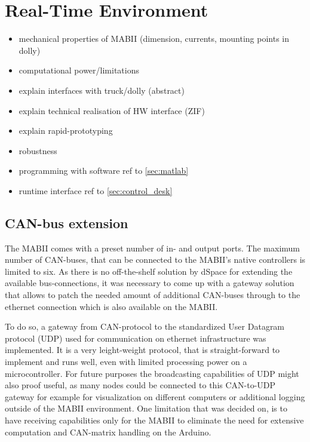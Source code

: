 \documentclass[ExampleMasters.tex]{subfiles}
\begin{document}
\section{Real-Time Environment}
\label{sec:realtime_environment}



\begin{itemize}
	\item mechanical properties of MABII (dimension, currents, mounting points in dolly)
	\item computational power/limitations
	\item explain interfaces with truck/dolly (abstract)
	\item explain technical realisation of HW interface (ZIF)
	\item explain rapid-prototyping
	\item robustness
	\item programming with software ref to \ref{sec:matlab}
	\item runtime interface ref to \ref{sec:control_desk}
\end{itemize}
\subsection{CAN-bus extension}
\label{sec:can_udp_gateway}
The MABII comes with a preset number of in- and output ports. The maximum number of CAN-buses, that can be connected to the MABII's native controllers is limited to six. As there is no off-the-shelf solution by dSpace for extending the available bus-connections, it was necessary to come up with a gateway solution that allows to patch the needed amount of additional CAN-buses through to the ethernet connection which is also available on the MABII. 

To do so, a gateway from CAN-protocol to the standardized User Datagram protocol (UDP) used for communication on ethernet  infrastructure was implemented. It is a very leight-weight protocol, that is straight-forward to implement and runs well, even with limited processing power on a microcontroller. For future purposes the broadcasting capabilities of UDP might also proof useful, as many nodes could be connected to this CAN-to-UDP gateway for example for visualization on different computers or additional logging outside of the MABII environment. One limitation that was decided on, is to have receiving capabilities only for the MABII to eliminate the need for extensive computation and CAN-matrix handling on the Arduino. \\
\end{document}
